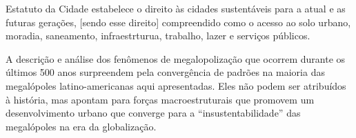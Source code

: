 \begin{citacao}
Estatuto da Cidade estabelece o direito às cidades sustentáveis para a atual e as futuras gerações, [sendo esse direito] compreendido como o acesso ao solo urbano, moradia, saneamento, infraestrturua, trabalho, lazer e serviços públicos.
\end{citacao}


\begin{citacao}
A descrição e análise dos fenômenos de megalopolização que ocorrem durante os últimos 500 anos surpreendem pela convergência de padrões na maioria das megalópoles latino-americanas aqui apresentadas. Eles não podem ser atribuídos à história, mas apontam para forças macroestruturais que promovem um desenvolvimento urbano que converge para a ``insustentabilidade'' das megalópoles na era da globalização. \cite{FREITAG2007}
\end{citacao}



